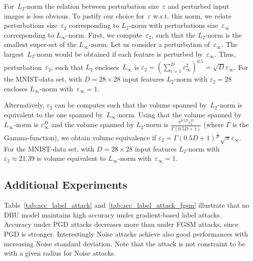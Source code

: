 For~$L_2$-norm the relation between perturbation size~$\varepsilon$ and perturbed input images is less obvious. To justify our choice for~$\varepsilon$ w.r.t. this norm, we relate perturbations size~$\varepsilon_2$ corresponding to $L_2$-norm with perturbations size~$\varepsilon_{\infty}$ corresponding to $L_{\infty}$-norm. 
First, we compute~$\varepsilon_2$, such that the $L_2$-norm is the smallest super-set of the $L_{\infty}$-norm. Let us consider a perturbation of~$\varepsilon_{\infty}$. The largest~$L_2$-norm would be obtained if each feature is perturbed by~$\varepsilon_{\infty}$. Thus, perturbation~$\varepsilon_2$, such that $L_2$ encloses~$L_{\infty}$ is $\varepsilon_2 = (\sum_{i=1}^{D} \varepsilon_{\infty}^2)^{0.5} = \sqrt{D} \varepsilon_{\infty}$. For the MNIST-data set, with $D=28 \times 28$ input features $L_2$-norm with $\varepsilon_2=28$ encloses $L_{\infty}$-norm with~$\varepsilon_{\infty}=1$. 

Alternatively, $\varepsilon_2$ can be computes such that the volume spanned by~$L_2$-norm is equivalent to the one spanned by~$L_{\infty}$-norm. Using that the volume spanned by $L_{\infty}$-norm is $\varepsilon_{\infty}^D$ and the volume spanned by $L_2$-norm is 
$\frac{\pi^{0.5 D} \varepsilon_2^D}{\Gamma(0.5 D +1)}$ (where $\Gamma$ is the Gamma-function), we obtain volume equivalence if 
$\varepsilon_2 = \Gamma(0.5 D +1)^{\frac{1}{D}} \sqrt{\pi} \varepsilon_{\infty}$. For the MNIST-data set, with $D=28 \times 28$ input features $L_2$-norm with $\varepsilon_2 \approx 21.39$ is volume equivalent to $L_{\infty}$-norm with~$\varepsilon_{\infty}=1$.











\newpage 
\subsection{Additional Experiments}



Table~\ref{tab:acc_label_attack} and~\ref{tab:acc_label_attack_fgsm} illustrate that no DBU model maintains high accuracy under gradient-based label attacks. Accuracy under PGD attacks decreases more than under FGSM attacks, since PGD is stronger.  Interestingly Noise attacks achieve also good performances with increasing Noise standard deviation. Note that the attack is not constraint to be with a given radius for Noise attacks.



